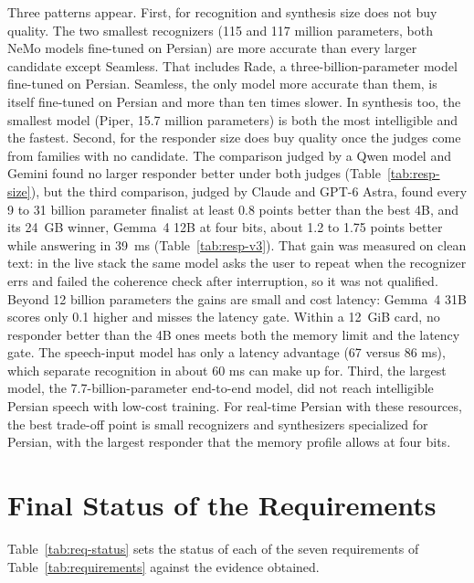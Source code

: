 Three patterns appear. First, for recognition and synthesis size does not buy quality. The two smallest
recognizers (115 and 117 million parameters, both NeMo models fine-tuned on Persian) are more
accurate than every larger candidate except Seamless. That includes Rade, a
three-billion-parameter model fine-tuned on Persian. Seamless, the only model more accurate
than them, is itself fine-tuned on Persian and more than ten times slower. In synthesis too, the
smallest model (Piper, 15.7 million parameters) is both the most intelligible and the fastest.
Second, for the responder size does buy quality once the judges come from families with no
candidate. The comparison judged by a Qwen model and Gemini found no larger responder better
under both judges (Table~\ref{tab:resp-size}), but the third comparison, judged by Claude and
GPT-6 Astra, found every 9 to 31 billion parameter finalist at least 0.8 points better than the
best 4B, and its 24~GB winner, Gemma~4 12B at four bits, about 1.2 to 1.75 points better while
answering in 39~ms (Table~\ref{tab:resp-v3}). That gain was measured on clean text: in the live
stack the same model asks the user to repeat when the recognizer errs and failed the coherence
check after interruption, so it was not qualified. Beyond 12 billion parameters the gains are small
and cost latency: Gemma~4 31B scores only 0.1 higher and misses the latency gate. Within a 12~GiB
card, no responder better than the 4B ones meets both the memory limit and the latency gate. The
speech-input model has only a latency advantage (67 versus 86 ms), which separate recognition in
about 60 ms can make up for. Third, the largest
model, the 7.7-billion-parameter end-to-end model, did not reach intelligible Persian speech with
low-cost training. For real-time Persian with these resources, the best trade-off point is small
recognizers and synthesizers specialized for Persian, with the largest responder that the memory
profile allows at four bits.

\section{Final Status of the Requirements}
\label{sec:res-requirements}

Table~\ref{tab:req-status} sets the status of each of the seven requirements of
Table~\ref{tab:requirements} against the evidence obtained.

